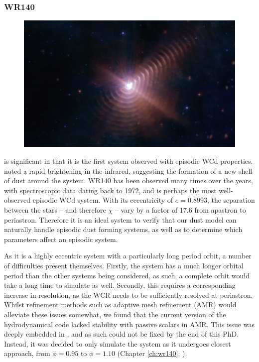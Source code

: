 \subsubsection{WR140}

\begin{figure}[h]
  \centering
  \includegraphics[width=5in]{assets/wr-140-jwst.png}
  \caption[JWST image of WR140]{}
  \label{fig:jwst-wr140}
\end{figure}

 is significant in that it is the first system observed with episodic WCd properties.
\textcite{williamsCondensationShellHD1978} noted a rapid brightening in the infrared, suggesting the formation of a new shell of dust around the system.
WR140 has been observed many times over the years, with spectroscopic data dating back to 1972, and is perhaps the most well-observed episodic WCd system.
With its eccentricity of $e=0.8993$, the separation between the stars -- and therefore $\chi$ -- vary by a factor of 17.6 from apastron to periastron.
Therefore it is an ideal system to verify that our dust model can naturally handle episodic dust forming systems, as well as to determine which parameters affect an episodic system.

As it is a highly eccentric system with a particularly long period orbit, a number of difficulties present themselves.
Firstly, the system has a much longer orbital period than the other systems being considered, as such, a complete orbit would take a long time to simulate as well.
Secondly, this requires a corresponding increase in resolution, as the WCR needs to be sufficiently resolved at periastron.
Whilst refinement methods such as adaptive mesh refinement (AMR) would alleviate these issues somewhat, we found that the current version of the \athena{} hydrodynamical code lacked stability with passive scalars in AMR.
This issue was deeply embedded in \athena{}, and as such could not be fixed by the end of this PhD.
Instead, it was decided to only simulate the system as it undergoes closest approach, from $\phi = 0.95$ to $\phi = 1.10$ (Chapter \ref{ch:wr140}; \cite{eatsonExploringDustGrowth2022}). 

